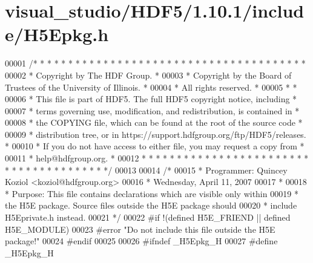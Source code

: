 \hypertarget{visual__studio_2_h_d_f5_21_810_81_2include_2_h5_epkg_8h_source}{}\section{visual\+\_\+studio/\+H\+D\+F5/1.10.1/include/\+H5\+Epkg.h}
\label{visual__studio_2_h_d_f5_21_810_81_2include_2_h5_epkg_8h_source}

\begin{DoxyCode}
00001 \textcolor{comment}{/* * * * * * * * * * * * * * * * * * * * * * * * * * * * * * * * * * * * * * *}
00002 \textcolor{comment}{ * Copyright by The HDF Group.                                               *}
00003 \textcolor{comment}{ * Copyright by the Board of Trustees of the University of Illinois.         *}
00004 \textcolor{comment}{ * All rights reserved.                                                      *}
00005 \textcolor{comment}{ *                                                                           *}
00006 \textcolor{comment}{ * This file is part of HDF5.  The full HDF5 copyright notice, including     *}
00007 \textcolor{comment}{ * terms governing use, modification, and redistribution, is contained in    *}
00008 \textcolor{comment}{ * the COPYING file, which can be found at the root of the source code       *}
00009 \textcolor{comment}{ * distribution tree, or in https://support.hdfgroup.org/ftp/HDF5/releases.  *}
00010 \textcolor{comment}{ * If you do not have access to either file, you may request a copy from     *}
00011 \textcolor{comment}{ * help@hdfgroup.org.                                                        *}
00012 \textcolor{comment}{ * * * * * * * * * * * * * * * * * * * * * * * * * * * * * * * * * * * * * * */}
00013 
00014 \textcolor{comment}{/*}
00015 \textcolor{comment}{ * Programmer:  Quincey Koziol <koziol@hdfgroup.org>}
00016 \textcolor{comment}{ *      Wednesday, April 11, 2007}
00017 \textcolor{comment}{ *}
00018 \textcolor{comment}{ * Purpose: This file contains declarations which are visible only within}
00019 \textcolor{comment}{ *      the H5E package.  Source files outside the H5E package should}
00020 \textcolor{comment}{ *      include H5Eprivate.h instead.}
00021 \textcolor{comment}{ */}
00022 \textcolor{preprocessor}{#if !(defined H5E\_FRIEND || defined H5E\_MODULE)}
00023 \textcolor{preprocessor}{#error "Do not include this file outside the H5E package!"}
00024 \textcolor{preprocessor}{#endif}
00025 
00026 \textcolor{preprocessor}{#ifndef \_H5Epkg\_H}
00027 \textcolor{preprocessor}{#define \_H5Epkg\_H}

\end{DoxyCode}
